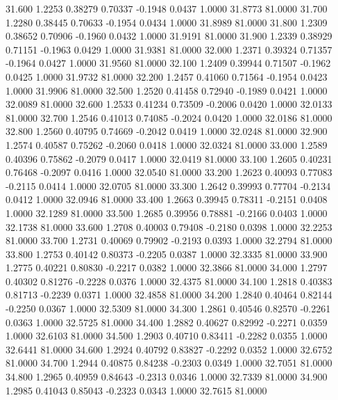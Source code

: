   31.600   1.2253   0.38279   0.70337  -0.1948   0.0437   1.0000  31.8773  81.0000
  31.700   1.2280   0.38445   0.70633  -0.1954   0.0434   1.0000  31.8989  81.0000
  31.800   1.2309   0.38652   0.70906  -0.1960   0.0432   1.0000  31.9191  81.0000
  31.900   1.2339   0.38929   0.71151  -0.1963   0.0429   1.0000  31.9381  81.0000
  32.000   1.2371   0.39324   0.71357  -0.1964   0.0427   1.0000  31.9560  81.0000
  32.100   1.2409   0.39944   0.71507  -0.1962   0.0425   1.0000  31.9732  81.0000
  32.200   1.2457   0.41060   0.71564  -0.1954   0.0423   1.0000  31.9906  81.0000
  32.500   1.2520   0.41458   0.72940  -0.1989   0.0421   1.0000  32.0089  81.0000
  32.600   1.2533   0.41234   0.73509  -0.2006   0.0420   1.0000  32.0133  81.0000
  32.700   1.2546   0.41013   0.74085  -0.2024   0.0420   1.0000  32.0186  81.0000
  32.800   1.2560   0.40795   0.74669  -0.2042   0.0419   1.0000  32.0248  81.0000
  32.900   1.2574   0.40587   0.75262  -0.2060   0.0418   1.0000  32.0324  81.0000
  33.000   1.2589   0.40396   0.75862  -0.2079   0.0417   1.0000  32.0419  81.0000
  33.100   1.2605   0.40231   0.76468  -0.2097   0.0416   1.0000  32.0540  81.0000
  33.200   1.2623   0.40093   0.77083  -0.2115   0.0414   1.0000  32.0705  81.0000
  33.300   1.2642   0.39993   0.77704  -0.2134   0.0412   1.0000  32.0946  81.0000
  33.400   1.2663   0.39945   0.78311  -0.2151   0.0408   1.0000  32.1289  81.0000
  33.500   1.2685   0.39956   0.78881  -0.2166   0.0403   1.0000  32.1738  81.0000
  33.600   1.2708   0.40003   0.79408  -0.2180   0.0398   1.0000  32.2253  81.0000
  33.700   1.2731   0.40069   0.79902  -0.2193   0.0393   1.0000  32.2794  81.0000
  33.800   1.2753   0.40142   0.80373  -0.2205   0.0387   1.0000  32.3335  81.0000
  33.900   1.2775   0.40221   0.80830  -0.2217   0.0382   1.0000  32.3866  81.0000
  34.000   1.2797   0.40302   0.81276  -0.2228   0.0376   1.0000  32.4375  81.0000
  34.100   1.2818   0.40383   0.81713  -0.2239   0.0371   1.0000  32.4858  81.0000
  34.200   1.2840   0.40464   0.82144  -0.2250   0.0367   1.0000  32.5309  81.0000
  34.300   1.2861   0.40546   0.82570  -0.2261   0.0363   1.0000  32.5725  81.0000
  34.400   1.2882   0.40627   0.82992  -0.2271   0.0359   1.0000  32.6103  81.0000
  34.500   1.2903   0.40710   0.83411  -0.2282   0.0355   1.0000  32.6441  81.0000
  34.600   1.2924   0.40792   0.83827  -0.2292   0.0352   1.0000  32.6752  81.0000
  34.700   1.2944   0.40875   0.84238  -0.2303   0.0349   1.0000  32.7051  81.0000
  34.800   1.2965   0.40959   0.84643  -0.2313   0.0346   1.0000  32.7339  81.0000
  34.900   1.2985   0.41043   0.85043  -0.2323   0.0343   1.0000  32.7615  81.0000
